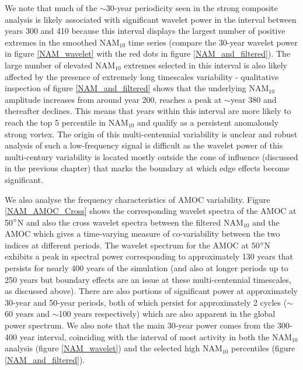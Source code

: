 We note that much of the $\sim$30-year periodicity seen in the strong composite analysis is likely associated with significant wavelet power in the interval between years 300 and 410 because this interval displays the largest number of positive extremes in the smoothed NAM$_{10}$ time series (compare the 30-year wavelet power in figure \ref{NAM_wavelet} with  the red dots in figure \ref{NAM_and_filtered}). The large number of elevated NAM$_{10}$ extremes selected in this interval is also likely affected by the presence of extremely long timescales variability - qualitative inspection of figure \ref{NAM_and_filtered} shows that the underlying NAM$_{10}$ amplitude increases from around year 200, reaches a peak at $\sim$year 380 and thereafter declines. This means that years within this interval are more likely to reach the top 5 percentile in NAM$_{10}$ and qualify as a persistent anomalously strong vortex. The origin of this multi-centennial variability is unclear and robust analysis of such a low-frequency signal is difficult as the wavelet power of this multi-century variability is located mostly outside the cone of influence (discussed in the previous chapter) that marks the boundary at which edge effects become significant. 

We also analyse the frequency characteristics of AMOC variability. Figure \ref{NAM_AMOC_Cross} shows the corresponding wavelet spectra of the AMOC at 50$\degree$N and also the cross wavelet spectra between the filtered NAM$_{10}$ and the AMOC which gives a time-varying measure of co-variability between the two indices at different periods. The wavelet spectrum for the AMOC at 50$\degree$N exhibits a peak in spectral power corresponding to approximately 130 years that persists for nearly 400 years of the simulation (and also at longer periods up to 250 years but boundary effects are an issue at these multi-centennial timescales, as discussed above). There are also portions of significant power at approximately 30-year and 50-year periods, both of which persist for approximately 2 cycles ($\sim$60 years and $\sim$100 years respectively) which are also apparent in the global power spectrum. We also note that the main 30-year power comes from the 300-400 year interval, coinciding with the interval of most activity in both the NAM$_{10}$ analysis (figure \ref{NAM_wavelet}) and the selected high NAM$_{10}$ percentiles (figure \ref{NAM_and_filtered}). 

